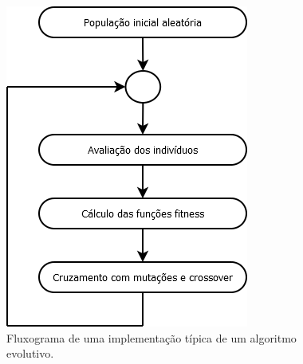 \begin{figure}[htb]
    \caption{Fluxograma de uma implementação típica de um algoritmo evolutivo.}
    \label{figura:fluxograma_ae}
    \centering
    \includegraphics[scale=1]{images/dia/fluxograma-ae}
    \fautor
\end{figure}